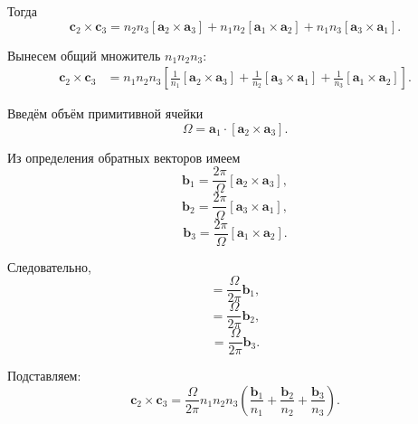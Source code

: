 \documentclass[../final.tex]{subfiles}
\begin{document}
Тогда
%
\begin{equation*}
    \boxed{
        \mathbf c_2\times\mathbf c_3
        =
        n_2n_3
        [\mathbf a_2\times\mathbf a_3]
        +
        n_1n_2
        [\mathbf a_1\times\mathbf a_2]
        +
        n_1n_3
        [\mathbf a_3\times\mathbf a_1]
    }.
\end{equation*}

Вынесем общий множитель $n_1n_2n_3$:
%
\begin{align*}
    \mathbf c_2\times\mathbf c_3
    &=
    n_1n_2n_3
    \left[
        \frac{1}{n_1}
        [\mathbf a_2\times\mathbf a_3]
        +
        \frac{1}{n_2}
        [\mathbf a_3\times\mathbf a_1]
        +
        \frac{1}{n_3}
        [\mathbf a_1\times\mathbf a_2]
    \right].
\end{align*}

Введём объём примитивной ячейки
%
\begin{equation*}
    \Omega
    =
    \mathbf a_1\cdot
    [\mathbf a_2\times\mathbf a_3].
\end{equation*}

Из определения обратных векторов имеем
%
\begin{equation*}
    \mathbf b_1
    =
    \frac{2\pi}{\Omega}
    [\mathbf a_2\times\mathbf a_3],
\end{equation*}
%
\begin{equation*}
    \mathbf b_2
    =
    \frac{2\pi}{\Omega}
    [\mathbf a_3\times\mathbf a_1],
\end{equation*}
%
\begin{equation*}
    \mathbf b_3
    =
    \frac{2\pi}{\Omega}
    [\mathbf a_1\times\mathbf a_2].
\end{equation*}

Следовательно,
%
\begin{equation*}
    [\mathbf a_2\times\mathbf a_3]
    =
    \frac{\Omega}{2\pi}\mathbf b_1,
\end{equation*}
%
\begin{equation*}
    [\mathbf a_3\times\mathbf a_1]
    =
    \frac{\Omega}{2\pi}\mathbf b_2,
\end{equation*}
%
\begin{equation*}
    [\mathbf a_1\times\mathbf a_2]
    =
    \frac{\Omega}{2\pi}\mathbf b_3.
\end{equation*}

Подставляем:
%
\begin{equation*}
    \mathbf c_2\times\mathbf c_3
    =
    \frac{\Omega}{2\pi}
    n_1n_2n_3
    \left(
        \frac{\mathbf b_1}{n_1}
        +
        \frac{\mathbf b_2}{n_2}
        +
        \frac{\mathbf b_3}{n_3}
    \right).
\end{equation*}
\end{document}
